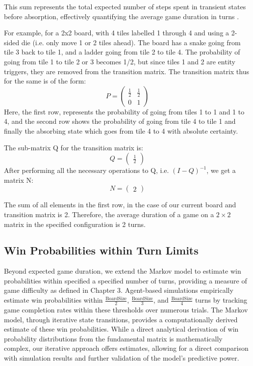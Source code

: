 This sum represents the total expected number of steps spent in transient states before absorption, effectively quantifying the average game duration in turns \autocites{dusautoyWorldEightyGames2024}.

For example, for a 2x2 board, with 4 tiles labelled 1 through 4 and using a 2-sided die (i.e. only move 1 or 2 tiles ahead). The board has a snake going from tile 3 back to tile 1, and a ladder going from tile 2 to tile 4. The probability of going from tile 1 to tile 2 or 3 becomes 1/2, but since tiles 1 and 2 are entity triggers, they are removed from the transition matrix. The transition matrix thus for the same is of the form:
$$P = \begin{pmatrix}
	\frac{1}{2} & \frac{1}{2}\\
	0 & 1
\end{pmatrix}$$
Here, the first row, represents the probability of going from tiles 1 to 1 and 1 to 4, and the second row shows the probability of going from tile 4 to tile 1 and finally the absorbing state which goes from tile 4 to 4 with absolute certainty.

The sub-matrix Q for the transition matrix is:
$$Q = \begin{pmatrix}
	\frac{1}{2}
\end{pmatrix}$$
After performing all the necessary operations to Q, i.e. $(I-Q)^{-1}$, we get a matrix N:
$$N = \begin{pmatrix}
	2
\end{pmatrix}$$

The sum of all elements in the first row, in the case of our current board and transition matrix is 2. Therefore, the average duration of a game on a $2\times2$ matrix in the specified configuration is 2 turns.

\subsection{Win Probabilities within Turn Limits}

Beyond expected game duration, we extend the Markov model to estimate win probabilities within specified a specified number of turns, providing a  measure of game difficulty as defined in Chapter 3. Agent-based simulations empirically estimate win probabilities within $\frac{\text{BoardSize}}{2}$, $\frac{\text{BoardSize}}{3}$, and $\frac{\text{BoardSize}}{4}$ turns by tracking game completion rates within these thresholds over numerous trials. The Markov model, through iterative state transitions, provides a computationally derived estimate of these win probabilities. While a direct analytical derivation of win probability distributions from the fundamental matrix is mathematically complex, our iterative approach offers estimates, allowing for a direct comparison with simulation results and further validation of the model's predictive power.

